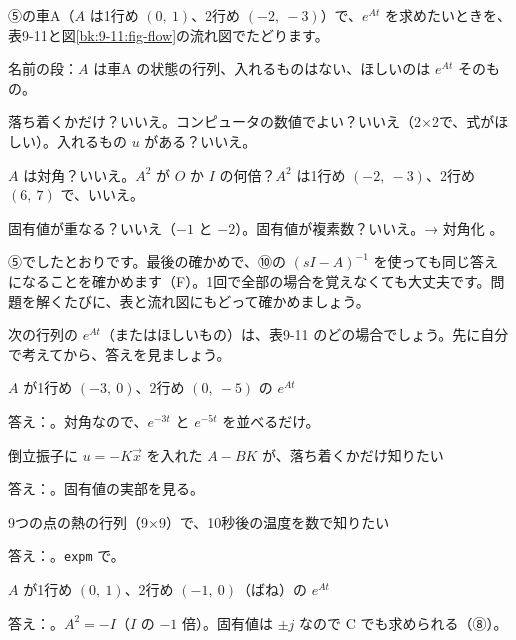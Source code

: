 ⑤の車A（$A$ は1行め $(0,\ 1)$、2行め $(-2,\ -3)$）で、$e^{At}$ を求めたいときを、表9-11と図\ref{bk:9-11:fig-flow}の流れ図でたどります。
\begin{enumerate}[label={\bkcircled[\bkTT]{\arabic*}}, leftmargin=2.4\zw, itemsep=1pt, topsep=2pt]
\item 名前の段：$A$ は車A の状態の行列、入れるものはない、ほしいのは $e^{At}$ そのもの。
\item 落ち着くかだけ？\enspace いいえ。\enspace コンピュータの数値でよい？\enspace いいえ（2×2で、式がほしい）。\enspace 入れるもの $u$ がある？\enspace いいえ。
\item $A$ は対角？\enspace いいえ。\enspace $A^2$ が $O$ か $I$ の何倍？\enspace $A^2$ は1行め $(-2,\ -3)$、2行め $(6,\ 7)$ で、いいえ。
\item 固有値が重なる？\enspace いいえ（$-1$ と $-2$）。\enspace 固有値が複素数？\enspace いいえ。→ 対角化 。
\end{enumerate}
⑤でしたとおりです。最後の確かめで、⑩の $(sI-A)^{-1}$ を使っても同じ答えになることを確かめます（F）。1回で全部の場合を覚えなくても大丈夫です。問題を解くたびに、表と流れ図にもどって確かめましょう。

次の行列の $e^{At}$（またはほしいもの）は、表9-11 のどの場合でしょう。先に自分で考えてから、答えを見ましょう。
\begin{enumerate}[label={\bkcircled[\bkTT]{\arabic*}}, leftmargin=2.4\zw, itemsep=3pt, topsep=2pt]
\item $A$ が1行め $(-3,\ 0)$、2行め $(0,\ -5)$ の $e^{At}$\par\nobreak\noindent 答え：。対角なので、$e^{-3t}$ と $e^{-5t}$ を並べるだけ。
\item 倒立振子に $u=-K\vec x$ を入れた $A-BK$ が、落ち着くかだけ知りたい\par\nobreak\noindent 答え：。固有値の実部を見る。
\item 9つの点の熱の行列（9×9）で、10秒後の温度を数で知りたい\par\nobreak\noindent 答え：。\texttt{expm} で。
\item $A$ が1行め $(0,\ 1)$、2行め $(-1,\ 0)$（ばね）の $e^{At}$\par\nobreak\noindent 答え：。$A^2=-I$（$I$ の $-1$ 倍）。固有値は $\pm j$ なので C でも求められる（⑧）。
\end{enumerate}


